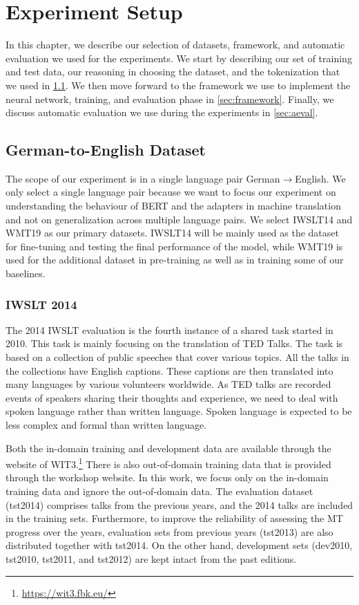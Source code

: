 
\chapter{Experiment Setup}
\label{chap:03}
In this chapter, we describe our selection of datasets, framework, and automatic evaluation we used for the experiments. We start by describing our set of training and test data, our reasoning in choosing the dataset, and the tokenization that we used in \cref{sec:dataset}. We then move forward to the framework we use to implement the neural network, training, and evaluation phase in \cref{sec:framework}. Finally, we discuss automatic evaluation we use during the experiments in  \cref{sec:aeval}.

\section{German-to-English Dataset}
\label{sec:dataset}
The scope of our experiment is in a single language pair German$\rightarrow$English. We only select a single language pair because we want to focus our experiment on understanding the behaviour of BERT and the adapters in machine translation and not on generalization across multiple language pairs. We select IWSLT14 and WMT19 as our primary datasets. IWSLT14 will be mainly used as the dataset for fine-tuning and testing the final performance of the model, while WMT19 is used for the additional dataset in pre-training as well as in training some of our baselines.

\subsection{IWSLT 2014}
The 2014 IWSLT evaluation  is the fourth instance of a shared task started in 2010. This task is mainly focusing on the translation of TED Talks. The task is based on a collection of public speeches that cover various topics. All the talks in the collections have English captions. These captions are then translated into many languages by various volunteers worldwide. As TED talks are recorded events of speakers sharing their thoughts and experience, we need to deal with spoken language rather than written language. Spoken language is expected to be less complex and formal than written language.

Both the in-domain training and development data are available through the website of WIT3.\footnote{\url{https://wit3.fbk.eu/}} There is also out-of-domain training data that is provided through the workshop website. In this work, we focus only on the in-domain training data and ignore the out-of-domain data. The evaluation dataset (tst2014) comprises talks from the previous years, and the 2014 talks are included in the training sets. Furthermore, to improve the reliability of assessing the MT progress over the years, evaluation sets from previous years (tst2013) are also distributed together with tst2014. On the other hand, development sets (dev2010, tst2010, tst2011, and tst2012) are kept intact from the past editions.

